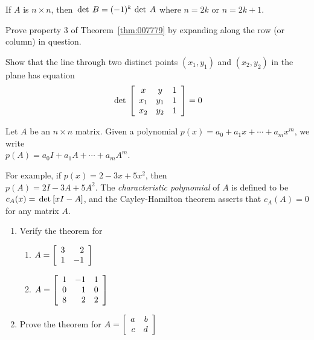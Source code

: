 \begin{multicols}{2}
\begin{ex}
\begin{sol}
If $A$ is $n \times n$, then $\thinspace\operatorname{det \medspace} B = (-1)^k \thinspace\operatorname{det \medspace} A$ where $n = 2k$ or $n = 2k + 1$.
\end{sol}
\end{ex}

\begin{ex}
Prove property 3 of Theorem~\ref{thm:007779} by expanding along the row (or column) in question.
\end{ex}

\begin{ex}
Show that the line through two distinct points $(x_{1}, y_{1})$ and $(x_{2}, y_{2})$ in the plane has equation
\begin{equation*}
\thinspace\operatorname{det\medspace} 
\left[ \begin{array}{ccc}
x & y & 1 \\
x_1 & y_1 & 1 \\
x_2 & y_2 & 1 
\end{array}
\right] = 0
\end{equation*}
\end{ex}

\begin{ex}
Let $A$ be an $n \times n$ matrix. Given a polynomial $p(x) = a_0 + a_1x + \cdots  + a_mx^m$, we write \\$p(A) = a_{0}I + a_1A + \cdots  + a_mA^m$. 

For example, if $p(x) = 2-3x+5x^2$, then \\ $p(A) = 2I -3A +5A^2$. The \textit{characteristic polynomial} of $A$ is defined to be $c_A(x) = \thinspace\operatorname{det\medspace} [xI - A]$, and the Cayley-Hamilton theorem asserts that $c_A(A) = 0$ for any matrix $A$.


\begin{enumerate}[label={\alph*.}]
\item Verify the theorem for
\begin{multicols}{2}
\begin{enumerate}[label={\roman*.}]
\item 
$A = \left[ \begin{array}{rr}
3 & 2 \\
1 & -1 
\end{array}\right]$
\item
$A = \left[ \begin{array}{rrr}
1 & -1 & 1 \\
0 & 1 & 0 \\
8 & 2 & 2 
\end{array}\right]
$
\end{enumerate}
\end{multicols}
\item Prove the theorem for $
A = \left[ \begin{array}{rr}
a & b \\
c & d 
\end{array}\right]
$
\end{enumerate}
\end{ex}


\end{multicols}
